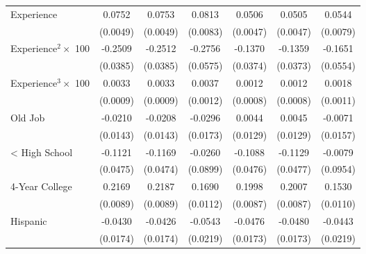 {\begin{longtable}{l*{6}{c}}
Experience          &      0.0752\sym{***}&      0.0753\sym{***}&      0.0813\sym{***}&      0.0506\sym{***}&      0.0505\sym{***}&      0.0544\sym{***}\\
                    &    (0.0049)         &    (0.0049)         &    (0.0083)         &    (0.0047)         &    (0.0047)         &    (0.0079)         \\
Experience$^2\times$ 100&     -0.2509\sym{***}&     -0.2512\sym{***}&     -0.2756\sym{***}&     -0.1370\sym{***}&     -0.1359\sym{***}&     -0.1651\sym{***}\\
                    &    (0.0385)         &    (0.0385)         &    (0.0575)         &    (0.0374)         &    (0.0373)         &    (0.0554)         \\
Experience$^3\times$ 100&      0.0033\sym{***}&      0.0033\sym{***}&      0.0037\sym{***}&      0.0012         &      0.0012         &      0.0018         \\
                    &    (0.0009)         &    (0.0009)         &    (0.0012)         &    (0.0008)         &    (0.0008)         &    (0.0011)         \\
Old Job             &     -0.0210         &     -0.0208         &     -0.0296\sym{*}  &      0.0044         &      0.0045         &     -0.0071         \\
                    &    (0.0143)         &    (0.0143)         &    (0.0173)         &    (0.0129)         &    (0.0129)         &    (0.0157)         \\
< High School       &     -0.1121\sym{**} &     -0.1169\sym{**} &     -0.0260         &     -0.1088\sym{**} &     -0.1129\sym{**} &     -0.0079         \\
                    &    (0.0475)         &    (0.0474)         &    (0.0899)         &    (0.0476)         &    (0.0477)         &    (0.0954)         \\
4-Year College      &      0.2169\sym{***}&      0.2187\sym{***}&      0.1690\sym{***}&      0.1998\sym{***}&      0.2007\sym{***}&      0.1530\sym{***}\\
                    &    (0.0089)         &    (0.0089)         &    (0.0112)         &    (0.0087)         &    (0.0087)         &    (0.0110)         \\
Hispanic            &     -0.0430\sym{**} &     -0.0426\sym{**} &     -0.0543\sym{**} &     -0.0476\sym{***}&     -0.0480\sym{***}&     -0.0443\sym{**} \\
                    &    (0.0174)         &    (0.0174)         &    (0.0219)         &    (0.0173)         &    (0.0173)         &    (0.0219)         \\

\end{longtable}}
